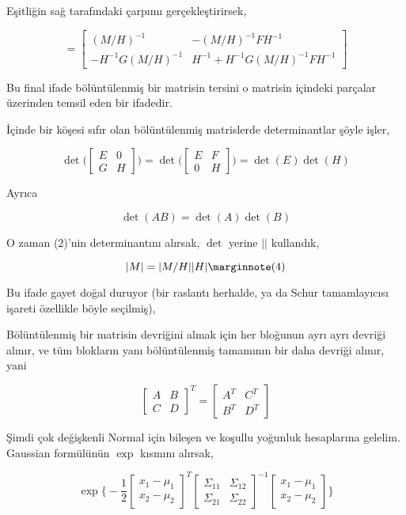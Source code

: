 \documentclass[12pt,fleqn]{article}\usepackage{../../common}
\begin{document}
Eşitliğin sağ tarafındaki çarpımı gerçekleştirirsek, 

$$ =
\left[\begin{array}{rr}
(M/H)^{-1} & -(M/H)^{-1}FH^{-1} \\
-H^{-1}G(M/H)^{-1} & H^{-1}+H^{-1}G(M/H)^{-1}FH^{-1} 
\end{array}\right]
 $$

Bu final ifade bölüntülenmiş bir matrisin tersini o matrisin içindeki parçalar
üzerinden temsil eden bir ifadedir. 

İçinde bir köşesi sıfır olan bölüntülenmiş matrislerde determinantlar şöyle
işler,

$$ 
\det \bigg(
\left[\begin{array}{rr}
E & 0 \\
G & H
\end{array}\right]
\bigg) 
= 
\det \bigg(
\left[\begin{array}{rr}
E & F \\
0 & H
\end{array}\right] 
\bigg) =
\det(E)\det(H)
 $$

Ayrıca 

$$ \det(AB) = \det(A)\det(B) $$

O zaman (2)'nin determinantını alırsak, $\det$ yerine $||$ kullandık, 

$$ |M| = |M/H||H| 
\mlabel{4}
$$

Bu ifade gayet doğal duruyor (bir raslantı herhalde, ya da Schur tamamlayıcısı 
işareti özellikle böyle seçilmiş),

Bölüntülenmiş bir matrisin devriğini almak için her bloğunun ayrı ayrı devriği
alınır, ve tüm blokların yanı bölüntülenmiş tamamının bir daha devriği alınır,
yani

$$ 
\left[\begin{array}{rr}
A & B \\ C & D 
\end{array}\right]^T = 
\left[\begin{array}{rr}
A^T & C^T \\ B^T & D^T
\end{array}\right]
 $$

Şimdi çok değişkenli Normal için bileşen ve koşullu yoğunluk hesaplarına
gelelim. Gaussian formülünün $\exp$ kısmını alırsak, 

$$ \exp 
\bigg\{ 
-\frac{ 1}{2}
\left[\begin{array}{r}
x_1 - \mu_1\\
x_2 - \mu_2
\end{array}\right]^T
\left[\begin{array}{rr}
\Sigma_{11} & \Sigma_{12}\\
\Sigma_{21} & \Sigma_{22}
\end{array}\right]^{-1}
\left[\begin{array}{r}
x_1 - \mu_1\\
x_2 - \mu_2
\end{array}\right]
\bigg\}
 $$
\end{document}
